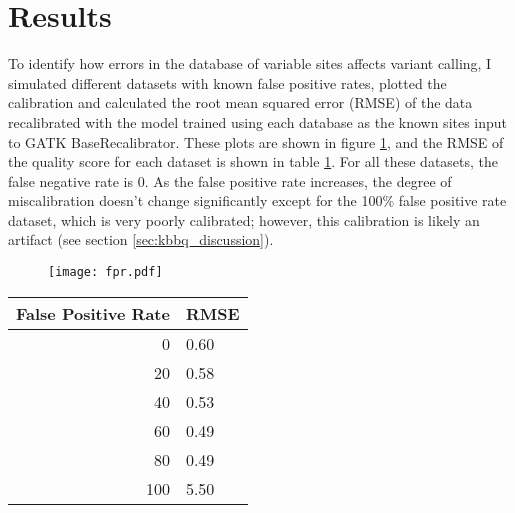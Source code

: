 \section{Results}
To identify how errors in the database of variable sites affects variant calling, I simulated different datasets with known false positive rates, plotted the calibration and calculated the root mean squared error (RMSE) of the data recalibrated with the model trained using each database as the known sites input to GATK BaseRecalibrator. These plots are shown in figure \ref{figure:fpr}, and the RMSE of the quality score for each dataset is shown in table \ref{table:fpr}. For all these datasets, the false negative rate is 0. As the false positive rate increases, the degree of miscalibration doesn't change significantly except for the 100\% false positive rate dataset, which is very poorly calibrated; however, this calibration is likely an artifact (see section \ref{sec:kbbq_discussion}).

\begin{figure}
\centering
	\texttt{[image: fpr.pdf]}
	\label{figure:fpr}
\end{figure}

\begin{table}
\centering
\begin{tabular}{r l}
\toprule
False Positive Rate & RMSE \\
\midrule
0 & 0.60 \\
20 & 0.58 \\
40 & 0.53 \\
60 & 0.49 \\
80 & 0.49 \\
100 & 5.50 \\
\bottomrule
\end{tabular}
\label{table:fpr}
\end{table}

